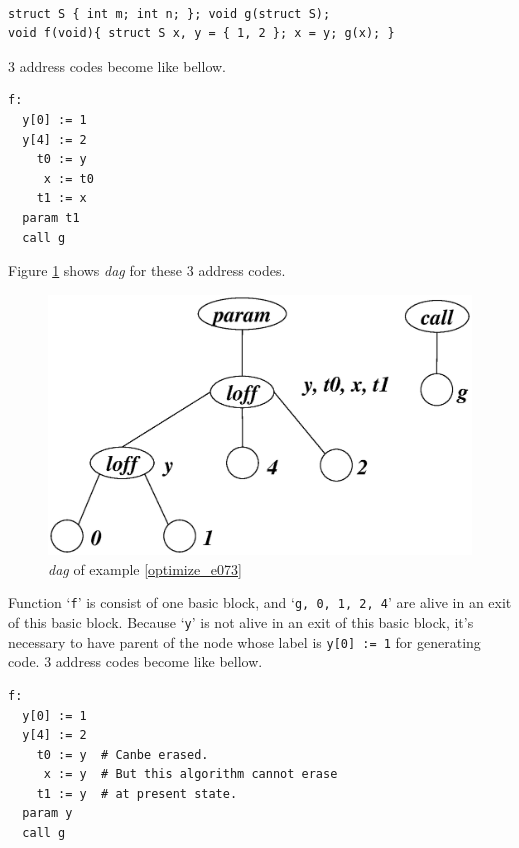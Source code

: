 \begin{Example}
\label{optimize_e073}
\begin{verbatim}

struct S { int m; int n; }; void g(struct S);
void f(void){ struct S x, y = { 1, 2 }; x = y; g(x); }
\end{verbatim}
3 address codes become like bellow.
\begin{verbatim}
f:
  y[0] := 1
  y[4] := 2
    t0 := y
     x := t0
    t1 := x
  param t1
  call g
\end{verbatim}
Figure \ref{optimize_e074} shows {\em dag} for these 3 address codes.
\begin{figure}[htbp]
\begin{center}
\includegraphics[width=1.2\linewidth,height=1.0\linewidth]{opt030.eps}
\caption{{\em dag} of example \ref{optimize_e073}}
\label{optimize_e074}
\end{center}
\end{figure}
Function `{\tt{f}}' is consist of one basic block, and 
`{\tt{g, 0, 1, 2, 4}}' are alive in an exit of this basic block.
Because `{\tt{y}}' is not alive in an exit of this basic block,
it's necessary to have parent of the node whose label is {\tt{y[0] := 1}}
for generating code.
3 address codes become like bellow.
\begin{verbatim}
f:
  y[0] := 1
  y[4] := 2
    t0 := y  # Canbe erased.
     x := y  # But this algorithm cannot erase
    t1 := y  # at present state.
  param y
  call g
\end{verbatim}
\end{Example}


